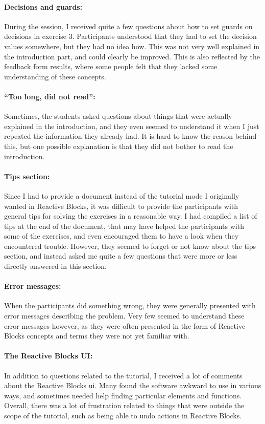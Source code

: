 \paragraph{Decisions and guards:} During the session, I received quite a few questions about how to set guards on decisions in exercise 3. Participants understood that they had to set the decision values somewhere, but they had no idea how. This was not very well explained in the introduction part, and could clearly be improved. This is also reflected by the feedback form results, where some people felt that they lacked some understanding of these concepts.

\paragraph{``Too long, did not read'':} Sometimes, the students asked questions about things that were actually explained in the introduction, and they even seemed to understand it when I just repeated the information they already had. It is hard to know the reason behind this, but one possible explanation is that they did not bother to read the introduction.

\paragraph{Tips section:} Since I had to provide a document instead of the tutorial mode I originally wanted in Reactive Blocks, it was difficult to provide the participants with general tips for solving the exercises in a reasonable way. I had compiled a list of tips at the end of the document, that may have helped the participants with some of the exercises, and even encouraged them to have a look when they encountered trouble. However, they seemed to forget or not know about the tips section, and instead asked me quite a few questions that were more or less directly answered in this section.

\paragraph{Error messages:} When the participants did something wrong, they were generally presented with error messages describing the problem. Very few seemed to understand these error messages however, as they were often presented in the form of Reactive Blocks concepts and terms they were not yet familiar with.

\paragraph{The Reactive Blocks UI:} In addition to questions related to the tutorial, I received a lot of comments about the Reactive Blocks \gls{ui}. Many found the software awkward to use in various ways, and sometimes needed help finding particular elements and functions. Overall, there was a lot of frustration related to things that were outside the scope of the tutorial, such as being able to undo actions in Reactive Blocks.

